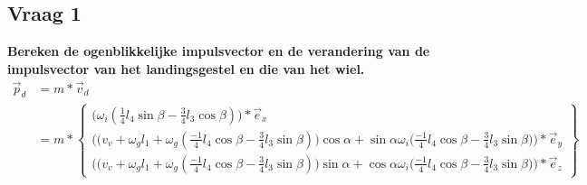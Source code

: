 \documentclass[a4paper,10pt]{article}
\begin{document}
\subsection{Vraag 1}
\textbf{Bereken de ogenblikkelijke impulsvector en de verandering van de impulsvector van het landingsgestel en die van het wiel.}\\
\begin{equation}
\begin{aligned}
\vec{p}_d &= m *\vec{v}_d \\
&= m * \begin{Bmatrix}
\Big(\omega_i  (\frac{1}{4}l_4 \sin{\beta}-\frac{3}{4}l_3  \cos{\beta})\Big) * \vec{e}_{x}\\
\Big(\big(v_v + \omega_g  l_1 + \omega_g(\frac{-1}{4} l_4 \cos{\beta}-\frac{3}{4} l_3 \sin{\beta}) \big) \cos{\alpha}  + \sin{\alpha}  \omega_i  \big( \frac{-1}{4}l_4 \cos{\beta} - \frac{3}{4}l_3 \sin{\beta}\big)\Big)*\vec{e}_{y} \\
\Big(\big(v_v + \omega_g   l_1 + \omega_g (\frac{-1}{4} l_4 \cos{\beta}-\frac{3}{4} l_3 \sin{\beta}) \big) \sin{\alpha}  + \cos{\alpha}  \omega_i   \big( \frac{-1}{4} l_4 \cos{\beta} - \frac{3}{4}l_3 \sin{\beta}\big)\Big)*\vec{e}_{z}
\end{Bmatrix}
\end{aligned}
\end{equation} 
\end{document}
